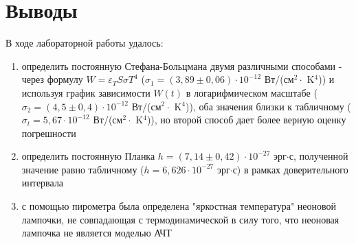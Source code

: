 \documentclass[a4paper,12pt]{extarticle}
\begin{document}
\section*{Выводы}
В ходе лабораторной работы удалось:
\begin{enumerate}
    \item определить постоянную Стефана-Больцмана двумя различными способами - через формулу $W = \varepsilon_T S \sigma T^4$ ($\sigma_1 = (3,89 \pm 0,06) \cdot 10^{-12}$ Вт/(см$^2 \cdot$ K$^4$)) и используя график зависимости $W(t)$ в логарифмическом масштабе ($\sigma_2 = (4,5 \pm 0,4) \cdot 10^{-12}$ Вт/(см$^2 \cdot$ K$^4$)), оба значения близки к табличному ($\sigma_t = 5,67\cdot 10^{-12}$ Вт/(см$^2 \cdot$ K$^4$)), но второй способ дает более верную оценку погрешности
    \item определить постоянную Планка $h = (7,14 \pm 0,42) \cdot 10^{-27}$ эрг$\cdot$с, полученной значение равно табличному ($h  = 6,626 \cdot 10^{-27}$ эрг$\cdot$с) в рамках доверительного интервала
    \item с помощью пирометра была определена "яркостная температура" неоновой лампочки, не совпадающая с термодинамической в силу того, что неоновая лампочка не является моделью АЧТ
\end{enumerate}
\end{document}
